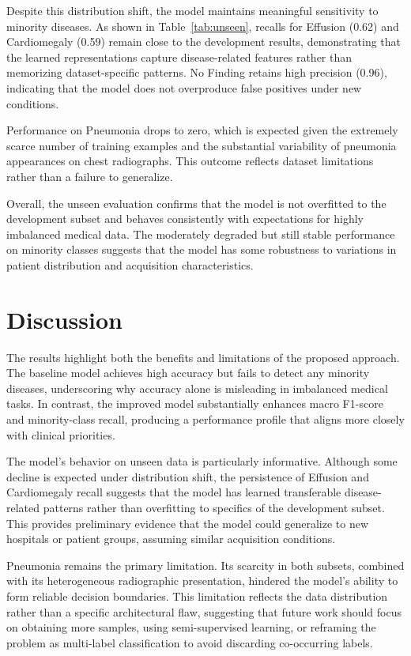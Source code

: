 \documentclass[final]{article}
\begin{document}
Despite this distribution shift, the model maintains meaningful sensitivity to minority diseases. As shown in Table~\ref{tab:unseen}, recalls for Effusion (0.62) and Cardiomegaly (0.59) remain close to the development results, demonstrating that the learned representations capture disease-related features rather than memorizing dataset-specific patterns. No Finding retains high precision (0.96), indicating that the model does not overproduce false positives under new conditions.

Performance on Pneumonia drops to zero, which is expected given the extremely scarce number of training examples and the substantial variability of pneumonia appearances on chest radiographs. This outcome reflects dataset limitations rather than a failure to generalize.

Overall, the unseen evaluation confirms that the model is not overfitted to the development subset and behaves consistently with expectations for highly imbalanced medical data. The moderately degraded but still stable performance on minority classes suggests that the model has some robustness to variations in patient distribution and acquisition characteristics.


\section{Discussion}
The results highlight both the benefits and limitations of the proposed approach. The baseline model achieves high accuracy but fails to detect any minority diseases, underscoring why accuracy alone is misleading in imbalanced medical tasks. In contrast, the improved model substantially enhances macro F1-score and minority-class recall, producing a performance profile that aligns more closely with clinical priorities.

The model’s behavior on unseen data is particularly informative. Although some decline is expected under distribution shift, the persistence of Effusion and Cardiomegaly recall suggests that the model has learned transferable disease-related patterns rather than overfitting to specifics of the development subset. This provides preliminary evidence that the model could generalize to new hospitals or patient groups, assuming similar acquisition conditions.

Pneumonia remains the primary limitation. Its scarcity in both subsets, combined with its heterogeneous radiographic presentation, hindered the model’s ability to form reliable decision boundaries. This limitation reflects the data distribution rather than a specific architectural flaw, suggesting that future work should focus on obtaining more samples, using semi-supervised learning, or reframing the problem as multi-label classification to avoid discarding co-occurring labels.
\end{document}
